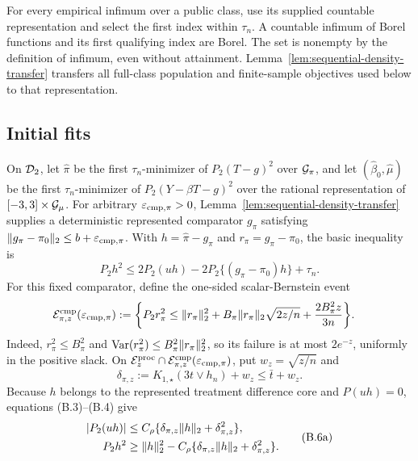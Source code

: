 For every empirical infimum over a public class, use its supplied countable
representation and select the first index within \(\tau_n\).  A countable
infimum of Borel functions and its first qualifying index are Borel.  The
set is nonempty by the definition of infimum, even without attainment.
Lemma~\ref{lem:sequential-density-transfer} transfers all full-class
population and finite-sample objectives used below to that representation.

\subsection{Initial fits}
\label{app:upper-initial}

On \(\mathcal D_2\), let \(\widehat\pi\) be the first
\(\tau_n\)-minimizer of \(P_2(T-g)^2\) over \(\mathcal G_\pi\), and let
\((\widehat\beta_0,\widehat\mu)\) be the first \(\tau_n\)-minimizer of
\(P_2(Y-\beta T-g)^2\) over the rational representation of
\([-3,3]\times\mathcal G_\mu\).  For arbitrary
\(\varepsilon_{\rm cmp,\pi}>0\),
Lemma~\ref{lem:sequential-density-transfer} supplies a deterministic
represented comparator \(g_\pi\) satisfying
\(\lVert g_\pi-\pi_0\rVert_2\le b+\varepsilon_{\rm cmp,\pi}\).  With
\(h=\widehat\pi-g_\pi\) and \(r_\pi=g_\pi-\pi_0\), the basic inequality is
\[
 P_2h^2\le2P_2(uh)-2P_2\{(g_\pi-\pi_0)h\}+\tau_n.
 \tag{B.6}
\]
For this fixed comparator, define the one-sided scalar-Bernstein event
\[
\begin{split}
 \mathcal E_{\pi,z}^{\rm cmp}(\varepsilon_{\rm cmp,\pi})
 :=\bigg\{P_2r_\pi^2\le{}&\lVert r_\pi\rVert_2^2
 +B_\pi\lVert r_\pi\rVert_2\sqrt{2z/n}
 +\frac{2B_\pi^2z}{3n}\bigg\}.
\end{split}
\]
Indeed, \(r_\pi^2\le B_\pi^2\) and
\(\operatorname{Var}(r_\pi^2)\le B_\pi^2\lVert r_\pi\rVert_2^2\), so its
failure is at most \(2e^{-z}\), uniformly in the positive slack.  On
\(\mathcal E_z^{\rm proc}\cap
\mathcal E_{\pi,z}^{\rm cmp}(\varepsilon_{\rm cmp,\pi})\),
put \(w_z=\sqrt{z/n}\) and
\[
 \delta_{\pi,z}:=K_{1,\star}(3t\vee h_n)+w_z
 \le \bar t+w_z.
\]
Because \(h\) belongs to the represented treatment difference core and
\(P(uh)=0\), equations (B.3)--(B.4) give
\begin{equation}
 \begin{split}
 |P_2(uh)|&\le C_\rho\{\delta_{\pi,z}\lVert h\rVert_2
                         +\delta_{\pi,z}^2\},\\
 P_2h^2&\ge \lVert h\rVert_2^2
       -C_\rho\{\delta_{\pi,z}\lVert h\rVert_2+\delta_{\pi,z}^2\}.
 \end{split}
 \tag{B.6a}
\end{equation}
